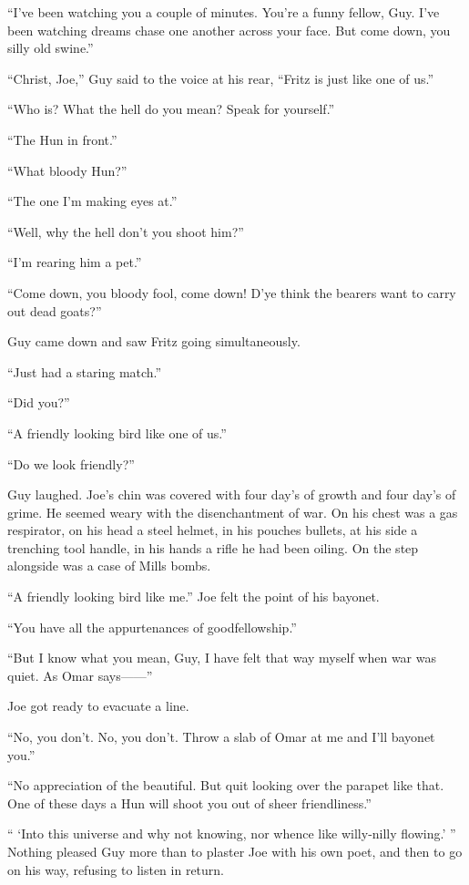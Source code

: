 ``I've been watching you a couple of minutes. You're a funny fellow, Guy. I've been watching dreams chase one another across your face. But come down, you silly old swine.''

``Christ, Joe,'' Guy said to the voice at his rear, ``Fritz is just like one of us.''

``Who is? What the hell do you mean? Speak for yourself.''

``The Hun in front.''

``What bloody Hun?''

``The one I'm making eyes at.''

``Well, why the hell don't you shoot him?''

``I'm rearing him a pet.''

``Come down, you bloody fool, come down! D'ye think the bearers want to carry out dead goats?''

Guy came down and saw Fritz going simultaneously.

``Just had a staring match.''

``Did you?''

``A friendly looking bird like one of us.''

``Do we look friendly?''

Guy laughed. Joe's chin was covered with four day's of growth and four day's of grime. He seemed weary with the disenchantment of war. On his chest was a gas respirator, on his head a steel helmet, in his pouches bullets, at his side a trenching tool handle, in his hands a rifle he had been oiling. On the step alongside was a case of Mills bombs.

``A friendly looking bird like me.'' Joe felt the point of his bayonet.

``You have all the appurtenances of goodfellowship.''

``But I know what you mean, Guy, I have felt that way myself when war was quiet. As Omar says------''

Joe got ready to evacuate a line.

``No, you don't. No, you don't. Throw a slab of Omar at me and I'll bayonet you.''

``No appreciation of the beautiful. But quit looking over the parapet like that. One of these days a Hun will shoot you out of sheer friendliness.''

`` `Into this universe and why not knowing, nor whence like willy-nilly flowing.' '' Nothing pleased Guy more than to plaster Joe with his own poet, and then to go on his way, refusing to listen in return.

